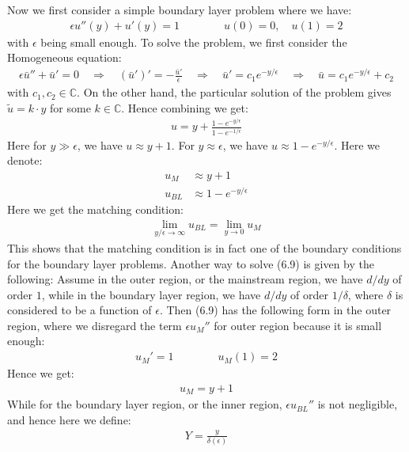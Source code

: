 \documentclass[11pt]{book}
\theoremstyle{break}
\theoremstyle{break}
\newcommand{\C}{\mathbb{C}}
\newcommand{\that}[1]{\widetilde{#1}}
\begin{document}
Now we first consider a simple boundary layer problem where we have:
\begin{align}
\epsilon u''(y) + u'(y) = 1 \qquad\qquad u(0) = 0, \quad u(1) = 2
\end{align}
with $\epsilon$ being small enough. To solve the problem, we first consider the Homogeneous equation:
\begin{align*}
\epsilon \bar{u}'' + \bar{u}' = 0 \quad \Rightarrow \quad (\bar{u}')' = -\frac{\bar{u}'}{\epsilon} \quad \Rightarrow \quad \bar{u}' = c_1 e^{-y/\epsilon}\quad \Rightarrow \quad \bar{u} = c_1 e^{-y/\epsilon} + c_2
\end{align*}
with $c_1 ,c_2 \in \C$. On the other hand, the particular solution of the problem gives $\that{u} = k\cdot y$ for some $k \in \C$. Hence combining we get:
\begin{align*}
u  = y + \frac{1-e^{-y/\epsilon}}{1 - e^{-1/\epsilon}}
\end{align*} 
Here for $y \gg \epsilon$, we have $u \approx y+1$. For $y \approx \epsilon$, we have $u \approx 1- e^{-y/\epsilon}$. Here we denote:
\begin{align*}
u_M &\approx y + 1 \tag{Mainstream behavior}\\
u_{BL} &\approx 1- e^{-y/\epsilon} \tag{Boundary layer behavior}
\end{align*}
Here we get the matching condition:
\begin{align*}
\lim_{y/\epsilon \to \infty}u_{BL} = \lim_{y\to 0}u_M
\end{align*}
This shows that the matching condition is in fact one of the boundary conditions for the boundary layer problems. Another way to solve (6.9) is given by the following: Assume in the outer region, or the mainstream region, we have $d/dy$ of order $1$, while in the boundary layer region, we have $d/dy$ of order $1/\delta$, where $\delta$ is considered to be a function of $\epsilon$. Then (6.9) has the following form in the outer region, where we disregard the term $\epsilon u_M''$ for outer region because it is small enough:
\begin{align*}
u_M' = 1 \qquad \qquad u_M(1) = 2
\end{align*}
Hence we get:
\begin{align*}
u_M = y+1
\end{align*}
While for the boundary layer region, or the inner region, $\epsilon u_{BL}''$ is not negligible, and hence here we define:
\begin{align*}
Y = \frac{y}{\delta(\epsilon)}
\end{align*}
\end{document}
